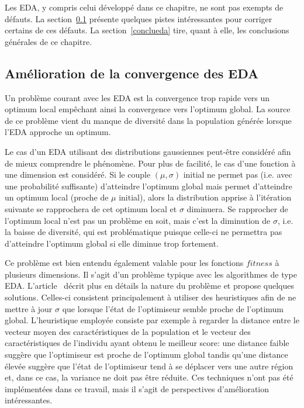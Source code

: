 \documentclass[a4paper, 12pt]{report}
\begin{document}
Les EDA, y compris celui développé dans ce chapitre, ne sont pas exempts de défauts. La section~\ref{edaimprove} présente quelques pistes intéressantes pour corriger certains de ces défauts. La section~\ref{conclueda} tire, quant à elle, les conclusions générales de ce chapitre.

\subsection{Amélioration de la convergence des EDA}
\label{edaimprove}
Un problème courant avec les EDA est la convergence trop rapide vers un optimum local empêchant ainsi la convergence vers l'optimum global. La source de ce problème vient du manque de diversité dans la population générée lorsque l'EDA approche un optimum. 

Le cas d'un EDA utilisant des distributions gaussiennes peut-être considéré afin de mieux comprendre le phénomène. Pour plus de facilité, le cas d'une fonction à une dimension est considéré. Si le couple $(\mu, \sigma)$ initial ne permet pas (i.e. avec une probabilité suffisante) d'atteindre l'optimum global mais permet d'atteindre un optimum local (proche de $\mu$ initial), alors la distribution apprise à l'itération suivante se rapprochera de cet optimum local et $\sigma$ diminuera. Se rapprocher de l'optimum local n'est pas un problème en soit, mais c'est la diminution de $\sigma$, i.e. la baisse de diversité, qui est problématique puisque celle-ci ne permettra pas d'atteindre l'optimum global si elle diminue trop fortement.

Ce problème est bien entendu également valable pour les fonctions $fitness$ à plusieurs dimensions. Il s'agit d'un problème typique avec les algorithmes de type EDA. L'article~\cite{DIVERSITE} décrit plus en détails la nature du problème et propose quelques solutions. Celles-ci consistent principalement à utiliser des heuristiques afin de ne mettre à jour $\sigma$ que lorsque l'état de l'optimiseur semble proche de l'optimum global. L'heuristique employée consiste par exemple à regarder la distance entre le vecteur moyen des caractéristiques de la population et le vecteur des caractéristiques de l'individu ayant obtenu le meilleur score: une distance faible suggère que l'optimiseur est proche de l'optimum global tandis qu'une distance élevée suggère que l'état de l'optimiseur tend à se déplacer vers une autre région et, dans ce cas, la variance ne doit pas être réduite. Ces techniques n'ont pas été implémentées dans ce travail, mais il s'agit de perspectives d'amélioration intéressantes.
\end{document}
